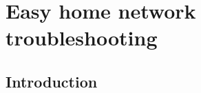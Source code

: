 \documentclass[12pt,twoside]{book}
\makeatletter
\renewcommand\listoffigures{%
    \section*{\listfigurename}%
      \@mkboth{\MakeUppercase\listfigurename}%
              {\MakeUppercase\listfigurename}%
    \@starttoc{lof}%
    }
\let\cleardoublepage\clearpage
\makeatother
\begin{document}
%

\chapter{Easy home network troubleshooting}
\label{chap:troubleshooting}

\section{Introduction}

\cleardoublepage
{}
{}




\end{document}
